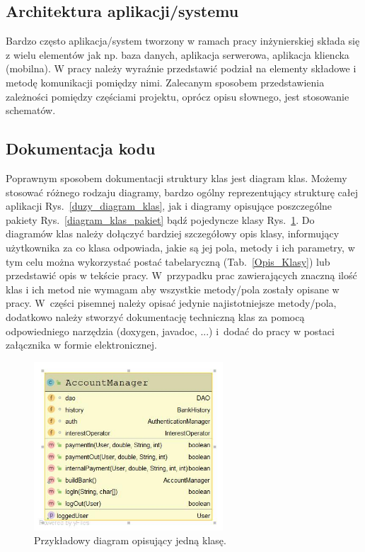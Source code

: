 \documentclass[12pt,a4paper]{article}
\begin{document}
\subsection{Architektura aplikacji/systemu}
Bardzo często aplikacja/system tworzony w ramach pracy inżynierskiej składa się z wielu elementów jak np. baza danych, aplikacja serwerowa, aplikacja kliencka (mobilna). W pracy należy wyraźnie przedstawić podział na elementy składowe i metodę komunikacji pomiędzy nimi. Zalecanym sposobem przedstawienia zależności pomiędzy częściami projektu, oprócz opisu słownego, jest stosowanie schematów.

\subsection{Dokumentacja kodu}
 Poprawnym sposobem dokumentacji struktury klas jest diagram klas. Możemy stosować różnego rodzaju diagramy, bardzo ogólny reprezentujący strukturę całej aplikacji Rys.~\ref{duzy_diagram_klas}, jak i diagramy opisujące poszczególne pakiety Rys.~\ref{diagram_klas_pakiet} bądź pojedyncze klasy Rys.~\ref{diagram_wybranej_klasy}. Do diagramów klas należy dołączyć bardziej szczegółowy opis klasy, informujący użytkownika za co klasa odpowiada, jakie są jej pola, metody i ich parametry, w tym celu można wykorzystać postać tabelaryczną (Tab.~\ref{Opis_Klasy}) lub przedstawić opis w tekście pracy. W~przypadku prac zawierających znaczną ilość klas i ich metod nie wymagam aby wszystkie metody/pola zostały opisane w pracy. W~części  pisemnej należy opisać jedynie najistotniejsze metody/pola, dodatkowo należy stworzyć dokumentację techniczną klas za pomocą odpowiedniego narzędzia (doxygen, javadoc, ...) i~dodać do pracy w postaci załącznika w formie elektronicznej.

\begin{figure}[!h]
\centering
\includegraphics[width = 200pt]{DiagramKlasy.jpg}
\caption{Przykładowy diagram opisujący jedną klasę.}\label{diagram_wybranej_klasy}
\end{figure}
\end{document}
